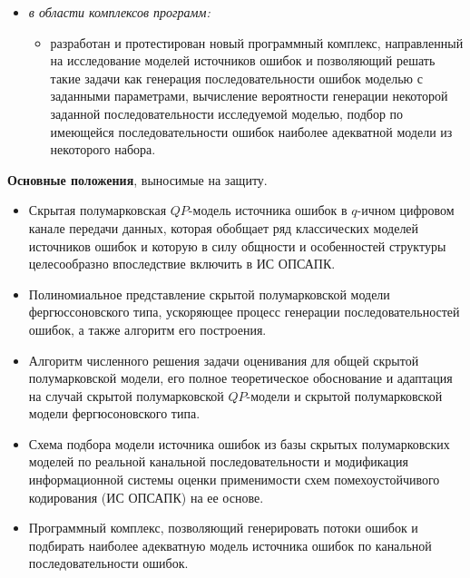 \documentclass[twoside,12pt]{article}
\begin{document}
\begin{itemize}
{\begin{itemize}
\end{itemize}
}
  \item {\textit{в области комплексов программ:}
  \begin{itemize}
  \item {разработан и протестирован новый программный комплекс, направленный на исследование моделей источников ошибок и позволяющий решать такие задачи как генерация последовательности ошибок моделью с заданными параметрами, вычисление вероятности генерации некоторой заданной последовательности исследуемой моделью, подбор по имеющейся последовательности ошибок наиболее адекватной модели из некоторого набора.
       }
\end{itemize}
}
\end{itemize}


\textbf{Основные положения}, выносимые на защиту.
\begin{itemize}
  \item Скрытая полумарковская $QP$-модель источника ошибок в $q$-ичном цифровом канале передачи данных, которая обобщает ряд классических моделей источников ошибок и которую в силу общности и особенностей структуры целесообразно впоследствие включить в ИС ОПСАПК.
  \item Полиномиальное представление скрытой полумарковской модели фергюссоновского типа, ускоряющее процесс генерации последовательностей ошибок, а также алгоритм его построения.
  \item Алгоритм численного решения задачи оценивания для общей скрытой полумарковской модели, его полное теоретическое обоснование и адаптация на случай скрытой полумарковской $QP$-модели и скрытой полумарковской модели фергюсоновского типа.
  \item Схема подбора модели источника ошибок из базы скрытых полумарковских моделей по реальной канальной последовательности и модификация информационной системы оценки применимости схем помехоустойчивого кодирования (ИС ОПСАПК) на ее основе.
  \item Программный комплекс, позволяющий генерировать потоки ошибок и подбирать наиболее адекватную модель источника ошибок по канальной последовательности ошибок.
%
\end{itemize}
\end{document}
